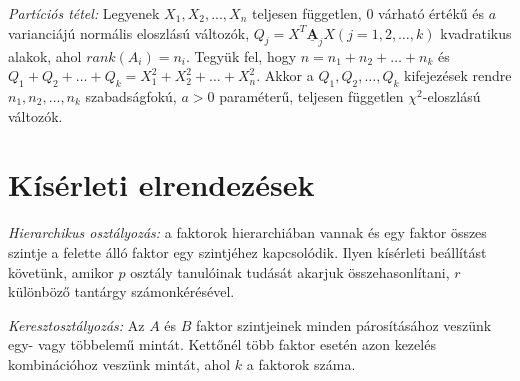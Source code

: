 \emph{Partíciós tétel:} Legyenek $X_1, X_2,...,X_n$ teljesen független, $0$ várható értékű és $a$ varianciájú normális eloszlású változók, $Q_j=X^T\mathbf{\underline{A}}_jX  (j=1,2,…, k)$ kvadratikus alakok, ahol $rank(A_i)=n_i$. Tegyük fel, hogy $n= n_1+ n_2+ …+n_k$ és $Q_1+ Q_2+ …+ Q_k = X_1^2+X_2^2+ …+X_n^2$. Akkor a $Q_1, Q_2, …, Q_k$ kifejezések rendre $n_1, n_2, …, n_k$ szabadságfokú, $a>0$ paraméterű, teljesen független $\chi^2$-eloszlású változók.

\section{Kísérleti elrendezések}

\emph{Hierarchikus osztályozás:} a faktorok hierarchiában vannak és egy faktor összes szintje a felette álló faktor egy szintjéhez kapcsolódik. Ilyen kísérleti beállítást követünk, amikor $p$ osztály tanulóinak tudását akarjuk összehasonlítani, $r$ különböző tantárgy számonkérésével.

\emph{Keresztosztályozás:} Az $A$ és $B$ faktor szintjeinek minden párosításához veszünk egy- vagy többelemű mintát. Kettőnél több faktor esetén azon kezelés kombinációhoz veszünk mintát, ahol $k$ a faktorok száma.

